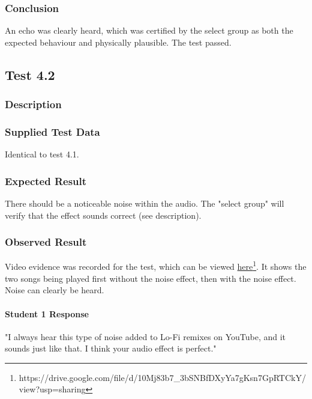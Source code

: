 \subsubsection{Conclusion}
An echo was clearly heard, which was certified by the select group as both the expected behaviour and physically plausible. The test passed.


\pagebreak
\subsection{Test 4.2}
\subsubsection{Description}
\paragraph{}
{
	\centering
}

\subsubsection{Supplied Test Data}
Identical to test 4.1.

\subsubsection{Expected Result}
There should be a noticeable noise within the audio. The "select group" will verify that the effect sounds correct (see description).

\subsubsection{Observed Result}
\label{sec:evidence4.2}
Video evidence was recorded for the test, which can be viewed \href{https://drive.google.com/file/d/10Mj83b7_3bSNBfDXyYa7gKsn7GpRTCkY/view?usp=sharing}{here}\footnote{
	https://drive.google.com/file/d/10Mj83b7\_3bSNBfDXyYa7gKsn7GpRTCkY/view?usp=sharing
}. It shows the two songs being played first without the noise effect, then with the noise effect. Noise can clearly be heard.

\paragraph{Student 1 Response}
"I always hear this type of noise added to Lo-Fi remixes on YouTube, and it sounds just like that. I think your audio effect is perfect."

